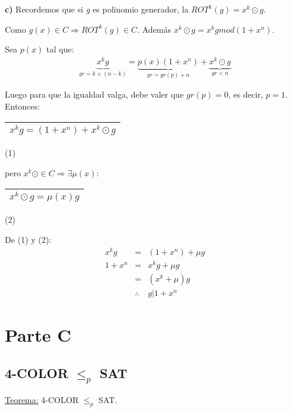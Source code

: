 \documentclass[12pt,a4paper]{report}
\begin{document}
			\textbf{c)} Recordemos que si \textit{g} es polinomio generador, la $ROT^{k}(g) = x^{k} \odot g$.
			\vspace{5mm}
			\par Como $g(x) \in C \Rightarrow ROT^{k}(g) \in C$. Además $x^{k} \odot g = x^{k} g mod (1 + x^{n}).$
			\vspace{3mm}
			\par Sea $p(x)$ tal que:
			\begin{eqnarray}
				\nonumber \underbrace{x^{k} g}_{gr = k + (n - k)} = \underbrace{p(x) (1 + x^{n})}_{gr = gr(p) + n} + \underbrace{x^{k} \odot g}_{gr < n}
			\end{eqnarray}
			\par Luego para que la igualdad valga, debe valer que $gr(p)	= 0$, es decir, $p = 1$. Entonces:
			\begin{center}
				\begin{tabular}{|c|} \hline $ x^{k} g = (1 + x^{n}) + x^{k} \odot g $ \\\hline \end{tabular} (1)
			\end{center}

			\par pero $x^{k} \odot \in C \Rightarrow \exists \mu(x) :$
			\begin{center}
				\begin{tabular}{|c|} \hline $ x^{k} \odot g = \mu(x) g $ \\\hline \end{tabular} (2)
			\end{center}

			\vspace{3mm}
			\par De (1) y (2):
			\begin{eqnarray}
				\nonumber x^{k} g &=& (1 + x^{n}) + \mu g \\
				\nonumber 1 + x^{n} &=& x^{k} g+ \mu g \\
				\nonumber &=& (x^{k} + \mu) g \\
				\nonumber & \therefore & g | 1 + x^{n}
			\end{eqnarray}



\chapter{Parte C}

	\section{4-COLOR $\leq_{\textit{p}}$ SAT}
		\underline{Teorema:} 4-COLOR $\leq_{p}$ SAT.
\end{document}
